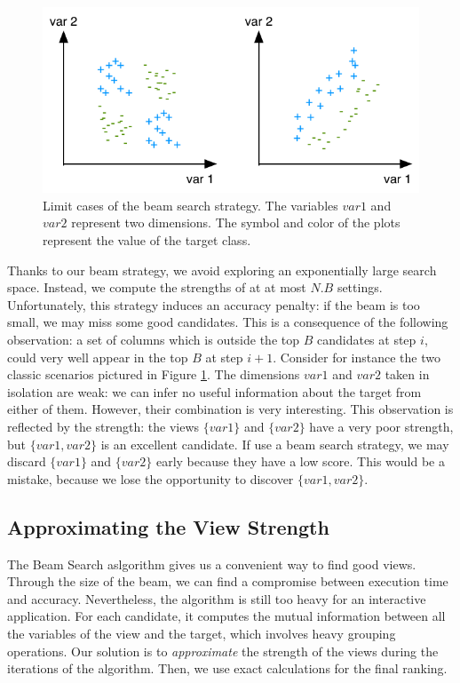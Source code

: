 \begin{figure}[t!]
\centering
\includegraphics[width=0.8\columnwidth]{images/strength-jump}
\caption{Limit cases of the beam search strategy. The variables $var1$ and
$var2$ represent two dimensions. The symbol and color of the plots represent
the value of the target class. }
\label{pic:strength-jump}
\end{figure}
Thanks to our beam strategy, we avoid exploring an exponentially large search
space. Instead, we compute the strengths of at at most $N.B$ settings.
Unfortunately, this strategy induces an accuracy penalty: if the beam is too
small, we may miss some good candidates. This is a consequence of the following
observation: a set of columns which is outside the top $B$ candidates at step
$i$, could very well appear in the top $B$ at step $i+1$. Consider for instance
the two classic scenarios pictured in Figure \ref{pic:strength-jump}. The
dimensions $var1$ and $var2$ taken in isolation are weak: we can infer no
useful information about the target from either of them. However, their
combination is very interesting.  This observation is reflected by the
strength: the views $\{var1\}$ and $\{var2\}$ have a very poor strength, but
$\{var1, var2\}$ is an excellent candidate. If use a beam search strategy, we
may discard  $\{var1\}$ and $\{var2\}$ early because they have a low score.
This would be a mistake, because we lose the opportunity to discover $\{var1,
var2\}$.

\subsection{Approximating the View Strength}
\label{sec:approx}

The Beam Search aslgorithm gives us a convenient way to find good views.
Through the size of the beam, we can find a compromise between execution time
and accuracy.  Nevertheless, the algorithm is still too heavy for an
interactive application. For each candidate, it computes the mutual information
between all the variables of the view and the target, which involves heavy grouping
operations. Our solution is to \emph{approximate} the strength of the views
during the iterations of the algorithm. Then, we use exact calculations for the
final ranking.

